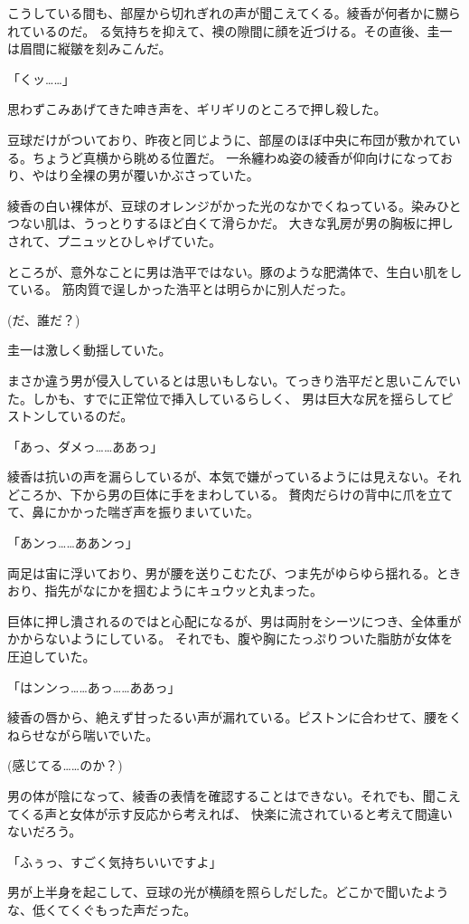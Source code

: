 ﻿\documentclass[
    book,tate,
    line_length=30zw,
    jafontsize=12pt,
    paper=b5j,
    landscape,
    ]{jlreq}
\begin{document}
こうしている間も、部屋から切れぎれの声が聞こえてくる。綾香が何者かに嬲られているのだ。
る気持ちを抑えて、襖の隙間に顔を近づける。その直後、圭一は眉間に縦皺を刻みこんだ。

「くッ……」

思わずこみあげてきた呻き声を、ギリギリのところで押し殺した。

豆球だけがついており、昨夜と同じように、部屋のほぼ中央に布団が敷かれている。ちょうど真横から眺める位置だ。
一糸纏わぬ姿の綾香が仰向けになっており、やはり全裸の男が覆いかぶさっていた。

綾香の白い裸体が、豆球のオレンジがかった光のなかでくねっている。染みひとつない肌は、うっとりするほど白くて滑らかだ。
大きな乳房が男の胸板に押しされて、プニュッとひしゃげていた。

ところが、意外なことに男は浩平ではない。豚のような肥満体で、生白い肌をしている。
筋肉質で逞しかった浩平とは明らかに別人だった。

(だ、誰だ？)

圭一は激しく動揺していた。

まさか違う男が侵入しているとは思いもしない。てっきり浩平だと思いこんでいた。しかも、すでに正常位で挿入しているらしく、
男は巨大な尻を揺らしてピストンしているのだ。

「あっ、ダメっ……ああっ」

綾香は抗いの声を漏らしているが、本気で嫌がっているようには見えない。それどころか、下から男の巨体に手をまわしている。
贅肉だらけの背中に爪を立てて、鼻にかかった喘ぎ声を振りまいていた。

「あンっ……ああンっ」

両足は宙に浮いており、男が腰を送りこむたび、つま先がゆらゆら揺れる。ときおり、指先がなにかを掴むようにキュウッと丸まった。

巨体に押し潰されるのではと心配になるが、男は両肘をシーツにつき、全体重がかからないようにしている。
それでも、腹や胸にたっぷりついた脂肪が女体を圧迫していた。

「はンンっ……あっ……ああっ」

綾香の唇から、絶えず甘ったるい声が漏れている。ピストンに合わせて、腰をくねらせながら喘いでいた。

(感じてる……のか？)

男の体が陰になって、綾香の表情を確認することはできない。それでも、聞こえてくる声と女体が示す反応から考えれば、
快楽に流されていると考えて間違いないだろう。

「ふぅっ、すごく気持ちいいですよ」

男が上半身を起こして、豆球の光が横顔を照らしだした。どこかで聞いたような、低くてくぐもった声だった。
\end{document}
